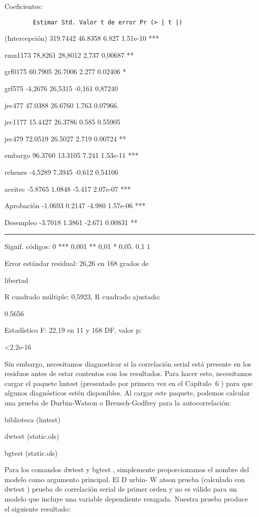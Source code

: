 \documentclass[
]{book}
\begin{document}
Coeficientes:

\begin{verbatim}
        Estimar Std. Valor t de error Pr (> | t |)
\end{verbatim}

(Intercepción) 319.7442 46.8358 6.827 1.51e-10 ***

rmn1173 78,8261 28,8012 2,737 0,00687 **

grf0175 60.7905 26.7006 2.277 0.02406 *

grf575 -4,2676 26,5315 -0,161 0,87240

jec477 47.0388 26.6760 1.763 0.07966.

jec1177 15.4427 26.3786 0.585 0.55905

jec479 72.0519 26.5027 2.719 0.00724 **

embargo 96.3760 13.3105 7.241 1.53e-11 ***

rehenes -4,5289 7,3945 -0,612 0,54106

aceitec -5.8765 1.0848 -5.417 2.07e-07 ***

Aprobación -1.0693 0.2147 -4.980 1.57e-06 ***

Desempleo -3.7018 1.3861 -2.671 0.00831 **

\begin{center}\rule{0.5\linewidth}{0.5pt}\end{center}

Signif. códigos: 0 *** 0,001 ** 0,01 * 0,05. 0,1 1

Error estándar residual: 26,26 en 168 grados de

libertad

R cuadrado múltiple: 0,5923, R cuadrado ajustado:

0.5656

Estadístico F: 22,19 en 11 y 168 DF, valor p:

\textless2.2e-16

Sin embargo, necesitamos diagnosticar si la correlación serial está presente en los residuos antes de estar contentos con los resultados. Para hacer esto, necesitamos cargar el paquete lmtest (presentado por primera vez en el Capítulo  6 ) para que algunos diagnósticos estén disponibles. Al cargar este paquete, podemos calcular una prueba de Durbin-Watson o Breusch-Godfrey para la autocorrelación:

biblioteca (lmtest)

dwtest (static.ols)

bgtest (static.ols)

Para los comandos dwtest y bgtest , simplemente proporcionamos el nombre del modelo como argumento principal. El D urbin- W atson prueba (calculado con dwtest ) prueba de correlación serial de primer orden y no es válido para un modelo que incluye una variable dependiente rezagada. Nuestra prueba produce el siguiente resultado:
\end{document}
